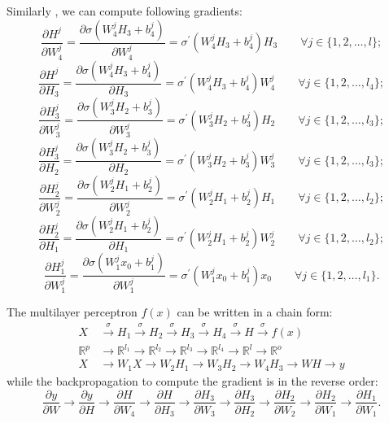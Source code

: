 \documentclass[titlestyle=hang,11pt]{elegantbook}
\begin{document}
Similarly , we can compute following gradients:
$$\frac{\partial H^j}{\partial W_4^j}  =\frac{\partial \sigma(W_4^j H_3+b_4^j)}{\partial W_4^j}  =\sigma^{\prime}(W_4^j H_3+b_4^j)H_3    \qquad\forall j\in\{1,2,\dots,l\};$$
$$\frac{\partial H^j}{\partial H_3}    =\frac{\partial \sigma(W_4^j H_3+b_4^j)}{\partial H_3}  =\sigma^{\prime}(W_4^j H_3+b_4^j)W_4^j  \qquad\forall j\in\{1,2,\dots,l_4\};$$
$$\frac{\partial H_3^j}{\partial W_3^j}=\frac{\partial \sigma(W_3^j H_2+b_3^j)}{\partial W_3^j}  =\sigma^{\prime}(W_3^j H_2+b_3^j)H_2    \qquad\forall j\in\{1,2,\dots,l_3\};$$
$$\frac{\partial H_3^j}{\partial H_2}  =\frac{\partial \sigma(W_3^j H_2+b_3^j)}{\partial H_2}  =\sigma^{\prime}(W_3^j H_2+b_3^j)W_3^j  \qquad\forall j\in\{1,2,\dots,l_3\};$$
$$\frac{\partial H_2^j}{\partial W_2^j}=\frac{\partial \sigma(W_2^j H_1+b_2^j)}{\partial W_2^j}  =\sigma^{\prime}(W_2^j H_1+b_2^j)H_1    \qquad\forall j\in\{1,2,\dots,l_2\};$$
$$\frac{\partial H_2^j}{\partial H_1}  =\frac{\partial \sigma(W_2^j H_1+b_2^j)}{\partial H_1}    =\sigma^{\prime}(W_2^j H_1+b_2^j)W_2^j  \qquad\forall j\in\{1,2,\dots,l_2\};$$
$$\frac{\partial H_1^j}{\partial W_1^j}=\frac{\partial \sigma(W_1^j x_0+b_1^j)}{\partial W_1^j}  =\sigma^{\prime}(W_1^j x_0+b_1^j)x_0    \qquad\forall j\in\{1,2,\dots,l_1\}.$$


The multilayer perceptron $f(x)$ can be written in a chain form:
\begin{align*}
X              & \stackrel{\sigma}{\to} H_1   \stackrel{\sigma}{\to} H_2   \stackrel{\sigma} \to H_3    \stackrel{\sigma} \to H_4    \stackrel{\sigma} \to H   \stackrel{\sigma}\to f(x)  \\
\mathbb{R}^{p} & \rightarrow \mathbb{R}^{l_1} \rightarrow \mathbb{R}^{l_2} \rightarrow \mathbb{R}^{l_3} \rightarrow \mathbb{R}^{l_4} \rightarrow \mathbb{R}^{l}\rightarrow \mathbb{R}^{o} \\
X              & \rightarrow W_1 X \rightarrow W_2H_1 \rightarrow W_3H_2 \rightarrow W_4H_3 \rightarrow WH \rightarrow y       
\end{align*}
while the backpropagation to compute the gradient is in the reverse order:
\begin{equation}
\frac{\partial y}{\partial W}\to \frac{\partial y}{\partial H}\to \frac{\partial H}{\partial W_4}
\to \frac{\partial H}{\partial H_3}\to \frac{\partial H_3}{\partial W_3}
\to \frac{\partial H_3}{\partial H_2}\to \frac{\partial H_2}{\partial W_2}
\to \frac{\partial H_2}{\partial W_1}\to \frac{\partial H_1}{\partial W_1}.
\end{equation}
\end{document}
